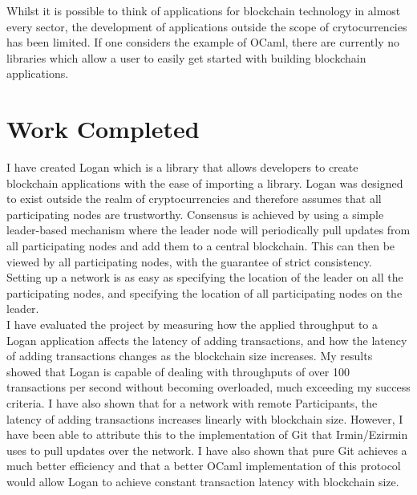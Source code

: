 \documentclass[12pt,a4paper,twoside,openright]{report}
\begin{document}
	Whilst it is possible to think of applications for blockchain technology in almost every sector, the development of applications outside the scope of crytocurrencies has been limited. 
	If one considers the example of OCaml, there are currently no libraries which allow a user to easily get started with building blockchain applications. \\

	\section{Work Completed}
	I have created Logan which is a library that allows developers to create blockchain applications with the ease of importing a library.
	Logan was designed to exist outside the realm of cryptocurrencies and therefore assumes that all participating nodes are trustworthy.
	Consensus is achieved by using a simple leader-based mechanism where the leader node will periodically pull updates from all participating nodes and add them to a central blockchain.
	This can then be viewed by all participating nodes, with the guarantee of strict consistency.
	Setting up a network is as easy as specifying the location of the leader on all the participating nodes, and specifying the location of all participating nodes on the leader.\\
	
	I have evaluated the project by measuring how the applied throughput to a Logan application affects the latency of adding transactions, and how the latency of adding transactions changes as the blockchain size increases.
	My results showed that Logan is capable of dealing with throughputs of over 100 transactions per second without becoming overloaded, much exceeding my success criteria.
	I have also shown that for a network with remote Participants, the latency of adding transactions increases linearly with blockchain size. 
	However, I have been able to attribute this to the implementation of Git that Irmin/Ezirmin uses to pull updates over the network. 
	I have also shown that pure Git achieves a much better efficiency and that a better OCaml implementation of this protocol would allow Logan to achieve constant transaction latency with blockchain size.
\end{document}
